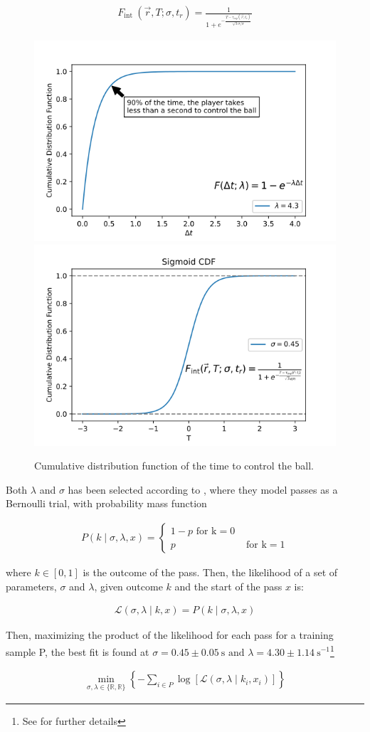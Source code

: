 \documentclass[
  twoside,nohyper]{book}
\begin{document}
\begin{align}
    F_{\text {int }}(\vec{r},T;\sigma, t_r)=\frac{1}{1+e^{-\frac{T- \tau_{exp}(\vec{r} ; t_r)}{\sqrt{3} \sigma / \pi}}}
    \label{sigmoid}
\end{align}

\begin{figure}[H]

{\centering \includegraphics[width=0.45\linewidth,]{imagenes/exp_poster} \includegraphics[width=0.45\linewidth,]{imagenes/sigmoid_poster} 

}

\caption{Cumulative distribution function of the time to control the ball.}\label{fig:lambda}
\end{figure}

Both \(\lambda\) and \(\sigma\) has been selected according to \citep{SpearmanFit}, where they model passes as a Bernoulli trial, with probability mass function

\begin{align}
P(k \mid \sigma, \lambda, x)=\left\{\begin{array}{lr}
1-p \text { for } \mathrm{k}=0 \\
p & \text { for } \mathrm{k}=1
\end{array}\right.
\end{align}

where \(k \in [0,1]\) is the outcome of the pass. Then, the likelihood of a set of\\
parameters, \(\sigma\) and \(\lambda\), given outcome \(k\) and the start of the pass \(x\) is:

\begin{align}
\mathcal{L}(\sigma, \lambda \mid k, x)=P(k \mid \sigma, \lambda, x)
\end{align}

Then, maximizing the product of the likelihood for each pass for a training sample P, the best fit is found at \(\sigma=0.45 \pm 0.05 \mathrm{~s} \text { and } \lambda=4.30 \pm 1.14 \mathrm{~s}^{-1}\)\footnote{See \citep{SpearmanFit} for further details}

\begin{align}
\min _{\sigma, \lambda \in\{\mathbb{R}, \mathbb{R}\}}\left\{-\sum_{i \in P} \log \left[\mathcal{L}\left(\sigma, \lambda \mid k_i, x_i\right)\right]\right\}
\end{align}

  
\end{document}
